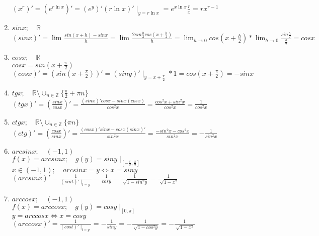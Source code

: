 \begin{properties}
\begin{enumerate}
            $(x^{r})'=(e^{r\ln {x}})'=(e^{y})'(r\ln {x})'\mid_{y=r\ln {x}}=e^{x\ln {x}}\displaystyle\frac{r}{x}=rx^{r-1}$ 
        \item $sinx; \quad  \mathbb{R}$\\
            $(sinx)'=\displaystyle\lim_{} \displaystyle\frac{sin(x+h)-sinx}{h}=\displaystyle\lim_{} \displaystyle\frac{2sin\displaystyle\frac{h}{2}cos(x+\displaystyle\frac{h}{2})}{h}=\displaystyle\lim_{h \to 0} cos(x+\displaystyle\frac{h}{2})*\displaystyle\lim_{h \to 0} \displaystyle\frac{sin\displaystyle\frac{h}{2}}{\displaystyle\frac{h}{2}}=cosx$ 
        \item $cosx; \quad  \mathbb{R}$\\
            $cosx=sin(x+\displaystyle\frac{\pi}{2})$ \\
            $(cosx)'=(sin(x+\displaystyle\frac{\pi}{2}))'=(siny)'\mid_{y=x+\displaystyle\frac{\pi}{2}}*1=cos(x+\displaystyle\frac{\pi}{2})=-sinx$ 
        \item $tgx; \quad  \mathbb{R} \setminus \cup_{n \in \mathbb{Z}} \{\displaystyle\frac{\pi}{2}+\pi n\}$ \\
            $(tgx)'=(\displaystyle\frac{sinx}{cosx})'=\displaystyle\frac{(sinx)'cosx-sinx(cosx)}{cos^2x}=\displaystyle\frac{cos^2x+sin^2x}{cos^2x}=\displaystyle\frac{1}{cos^2x}$ 
        \item $ctgx; \quad  \mathbb{R} \setminus \cup_{n \in \mathbb{Z}}\{\pi n\}$ \\
            $(ctg)'=(\displaystyle\frac{cosx}{sinx})'=\displaystyle\frac{(cosx)'sinx-cosx(sinx)'}{sin^2x}=\displaystyle\frac{-sin^2x-cos^2x}{sin^2x}=-\displaystyle\frac{1}{sin^2x}$ 
        \item $arcsinx; \quad  (-1, 1)$ \\
        $f(x)=arcsinx; \quad g(y)=siny\mid_{[-\displaystyle\frac{\pi}{2}, \displaystyle\frac{\pi}{2}]}$ \\
                $x \in (-1, 1); \quad arcsinx=y \iff x=siny$ \\
                $(arcsinx)'=\displaystyle\frac{1}{(sint)'\mid_{t=y}}=\displaystyle\frac{1}{cosy}=\displaystyle\frac{1}{\sqrt[]{1-sin^2y}}=\displaystyle\frac{1}{\sqrt[]{1-x^2}}$
            \item $arccosx; \quad (-1,1)$ \\
                $f(x)=arccosx; \quad g(y)=cosy\mid_{[0,\pi]}$ \\
                $y=arccosx \iff x=cosy$\\
                $(arccosx)'=\displaystyle\frac{1}{(cost)'\mid_{t=y}}=-\displaystyle\frac{1}{siny}=-\displaystyle\frac{1}{\sqrt[]{1-cos^2y}}=-\displaystyle\frac{1}{\sqrt[]{1-x^2}}$ 

\end{enumerate}
\end{properties}
